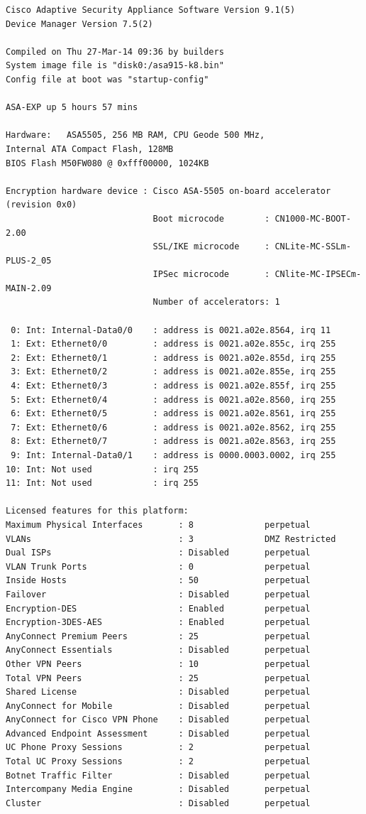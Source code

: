 \documentclass[12pt]{article}
\begin{document}
\vspace{-5pt}
\begin{lstlisting}[style=python,basicstyle=\ttfamily\scriptsize]
 Cisco Adaptive Security Appliance Software Version 9.1(5) 
Device Manager Version 7.5(2)

Compiled on Thu 27-Mar-14 09:36 by builders
System image file is "disk0:/asa915-k8.bin"
Config file at boot was "startup-config"

ASA-EXP up 5 hours 57 mins

Hardware:   ASA5505, 256 MB RAM, CPU Geode 500 MHz,
Internal ATA Compact Flash, 128MB
BIOS Flash M50FW080 @ 0xfff00000, 1024KB

Encryption hardware device : Cisco ASA-5505 on-board accelerator (revision 0x0)
                             Boot microcode        : CN1000-MC-BOOT-2.00 
                             SSL/IKE microcode     : CNLite-MC-SSLm-PLUS-2_05
                             IPSec microcode       : CNlite-MC-IPSECm-MAIN-2.09
                             Number of accelerators: 1

 0: Int: Internal-Data0/0    : address is 0021.a02e.8564, irq 11
 1: Ext: Ethernet0/0         : address is 0021.a02e.855c, irq 255
 2: Ext: Ethernet0/1         : address is 0021.a02e.855d, irq 255
 3: Ext: Ethernet0/2         : address is 0021.a02e.855e, irq 255
 4: Ext: Ethernet0/3         : address is 0021.a02e.855f, irq 255
 5: Ext: Ethernet0/4         : address is 0021.a02e.8560, irq 255
 6: Ext: Ethernet0/5         : address is 0021.a02e.8561, irq 255
 7: Ext: Ethernet0/6         : address is 0021.a02e.8562, irq 255
 8: Ext: Ethernet0/7         : address is 0021.a02e.8563, irq 255
 9: Int: Internal-Data0/1    : address is 0000.0003.0002, irq 255
10: Int: Not used            : irq 255
11: Int: Not used            : irq 255

Licensed features for this platform:
Maximum Physical Interfaces       : 8              perpetual
VLANs                             : 3              DMZ Restricted
Dual ISPs                         : Disabled       perpetual
VLAN Trunk Ports                  : 0              perpetual
Inside Hosts                      : 50             perpetual
Failover                          : Disabled       perpetual
Encryption-DES                    : Enabled        perpetual
Encryption-3DES-AES               : Enabled        perpetual
AnyConnect Premium Peers          : 25             perpetual
AnyConnect Essentials             : Disabled       perpetual
Other VPN Peers                   : 10             perpetual
Total VPN Peers                   : 25             perpetual
Shared License                    : Disabled       perpetual
AnyConnect for Mobile             : Disabled       perpetual
AnyConnect for Cisco VPN Phone    : Disabled       perpetual
Advanced Endpoint Assessment      : Disabled       perpetual
UC Phone Proxy Sessions           : 2              perpetual
Total UC Proxy Sessions           : 2              perpetual
Botnet Traffic Filter             : Disabled       perpetual
Intercompany Media Engine         : Disabled       perpetual
Cluster                           : Disabled       perpetual


\end{lstlisting}
\end{document}
